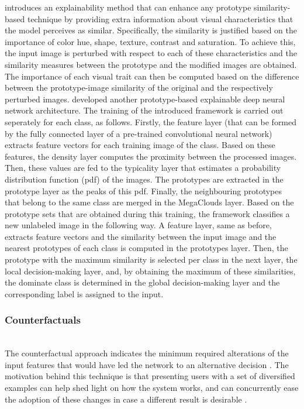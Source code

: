 \documentclass[journal]{IEEEtran}
\begin{document}
\cite{Nauta2020} introduces an explainability method that can enhance any prototype similarity-based technique by providing extra information about visual characteristics that the model perceives as similar. Specifically, the similarity is justified based on the importance of color hue, shape, texture, contrast and saturation. To achieve this, the input image is perturbed with respect to each of these characteristics and the similarity measures between the prototype and the modified images are obtained. The importance of each visual trait can then be computed based on the difference between the prototype-image similarity of the original and the respectively perturbed images.
\cite{Angelov2020} developed another prototype-based explainable deep neural network architecture. The training of the introduced framework is carried out seperately for each class, as follows. Firstly, the feature layer (that can be formed by the fully connected layer of a pre-trained convolutional neural network) extracts feature vectors for each training image of the class. Based on these features, the density layer computes the proximity between the processed images. Then, these values are fed to the typicality layer that estimates a probability distribution function (pdf) of the images. The prototypes are extracted in the prototype layer as the peaks of this pdf. Finally, the neighbouring prototypes that belong to the same class are merged in the MegaClouds layer. Based on the prototype sets that are obtained during this training, the framework classifies a new unlabeled image in the following way. A feature layer, same as before, extracts feature vectors and the similarity between the input image and the nearest prototypes of each class is computed in the prototypes layer. Then, the prototype with the maximum similarity is selected per class in the next layer, the local decision-making layer, and, by obtaining the maximum of these similarities, the dominate class is determined in the global decision-making layer and the corresponding label is assigned to the input.

\subsubsection{Counterfactuals}
\hfill\\
The counterfactual approach indicates the minimum required alterations of the input features that would have led the network to an alternative decision \cite{Wachter2017}. The motivation behind this technique is that presenting users with a set of diversified examples can help shed light on how the system works, and can concurrently ease the adoption of these changes in case a different result is desirable \cite{Confalonieri2021}. 
\end{document}

